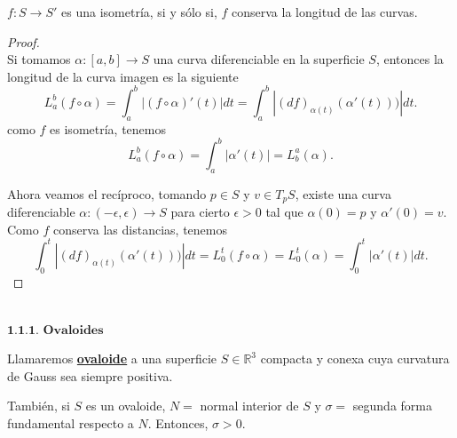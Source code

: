 \begin{proposicion}
	$f : S \to S'$ es una isometría, si y sólo si, $f$ conserva la longitud de las curvas.
\end{proposicion}

\begin{proof}
	${}$\\
	
	Si tomamos $\alpha : [a,b] \to S$ una curva diferenciable en la superficie $S$, entonces la longitud de la curva imagen es la siguiente
	\[
	L^{b}_{a} (f \circ \alpha) = \int^{b}_{a} |(f \circ \alpha)'(t)| dt = \int^{b}_{a} |(df)_{\alpha(t)}(\alpha'(t)))| dt.
	\]
	como $f$ es isometría, tenemos
	\[
	L^{b}_{a} (f \circ \alpha) = \int^{b}_{a} |\alpha'(t)| = L^{a}_{b} (\alpha).
	\]
	
	Ahora veamos el recíproco, tomando $p \in S$ y $v \in T_p S$, existe una curva diferenciable $\alpha : (-\epsilon, \epsilon) \to S$ para cierto $\epsilon > 0$ tal que $\alpha(0) = p$ y $\alpha'(0) = v$. Como $f$ conserva las distancias, tenemos
	\[
	\int^{t}_{0}|(df)_{\alpha(t)}(\alpha'(t)))| dt = L^{t}_{0} (f \circ \alpha) = L^{t}_{0}(\alpha) = \int^{t}_{0} |\alpha'(t)|dt.
	\]
	
\end{proof}


${ }$\\
$\textbf{1.1.1. Ovaloides}$
${ }$\\

\begin{definicion}
	Llamaremos \underline{\textbf{ovaloide}} a una superficie $S \in \mathbb{R}^3$ compacta y conexa cuya curvatura de Gauss sea siempre positiva.
	
	También, si $S$ es un ovaloide, $N =$ normal interior de $S$ y $\sigma =$ segunda forma fundamental respecto a $N$. Entonces, $\sigma > 0$.
\end{definicion}


